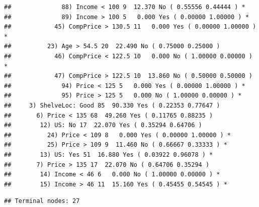 \documentclass[
  11pt,
]{article}
\newenvironment{Shaded}{\begin{snugshade}}{\end{snugshade}}
\newcommand{\AttributeTok}[1]{\textcolor[rgb]{0.13,0.29,0.53}{#1}}
\newcommand{\FunctionTok}[1]{\textcolor[rgb]{0.13,0.29,0.53}{\textbf{#1}}}
\newcommand{\NormalTok}[1]{#1}
\newcommand{\SpecialCharTok}[1]{\textcolor[rgb]{0.81,0.36,0.00}{\textbf{#1}}}
\newcommand{\StringTok}[1]{\textcolor[rgb]{0.31,0.60,0.02}{#1}}
\begin{document}
\begin{verbatim}
##              88) Income < 100 9  12.370 No ( 0.55556 0.44444 ) *
##              89) Income > 100 5   0.000 Yes ( 0.00000 1.00000 ) *
##            45) CompPrice > 130.5 11   0.000 Yes ( 0.00000 1.00000 ) *
##          23) Age > 54.5 20  22.490 No ( 0.75000 0.25000 )  
##            46) CompPrice < 122.5 10   0.000 No ( 1.00000 0.00000 ) *
##            47) CompPrice > 122.5 10  13.860 No ( 0.50000 0.50000 )  
##              94) Price < 125 5   0.000 Yes ( 0.00000 1.00000 ) *
##              95) Price > 125 5   0.000 No ( 1.00000 0.00000 ) *
##     3) ShelveLoc: Good 85  90.330 Yes ( 0.22353 0.77647 )  
##       6) Price < 135 68  49.260 Yes ( 0.11765 0.88235 )  
##        12) US: No 17  22.070 Yes ( 0.35294 0.64706 )  
##          24) Price < 109 8   0.000 Yes ( 0.00000 1.00000 ) *
##          25) Price > 109 9  11.460 No ( 0.66667 0.33333 ) *
##        13) US: Yes 51  16.880 Yes ( 0.03922 0.96078 ) *
##       7) Price > 135 17  22.070 No ( 0.64706 0.35294 )  
##        14) Income < 46 6   0.000 No ( 1.00000 0.00000 ) *
##        15) Income > 46 11  15.160 Yes ( 0.45455 0.54545 ) *
\end{verbatim}

\begin{Shaded}
\end{Shaded}

\begin{verbatim}
## Terminal nodes: 27
\end{verbatim}

\begin{Shaded}
\end{Shaded}
\end{document}
